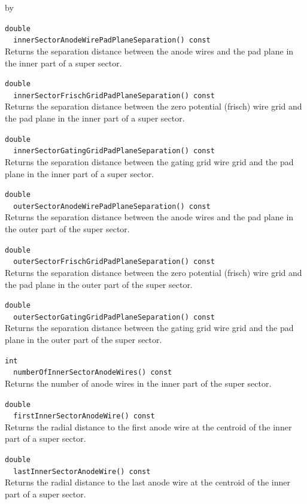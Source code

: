 \documentclass[twoside]{article}
\newcommand{\entrylabel}[1]{\mbox{\textbf{{#1}}}\hfil}%
\newenvironment{entry}
{\begin{list}{}%
    {\renewcommand{\makelabel}{\entrylabel}%
     \setlength{\labelwidth}{90pt}%
     \setlength{\leftmargin}{\labelwidth}
     \advance\leftmargin by \labelsep%
      }%
    }%
  {\end{list}}
\newcommand{\Entrylabel}[1]%
{\raisebox{0pt}[1ex][0pt]{\makebox[\labelwidth][l]%
    {\parbox[t]{\labelwidth}{\hspace{0pt}\textbf{{#1}}}}}}
\newenvironment{Entry}%
{\renewcommand{\entrylabel}{\Entrylabel}\begin{entry}}%
  {\end{entry}}
\begin{document}
\begin{Entry}
  \verb+double+\\
  \verb+  innerSectorAnodeWirePadPlaneSeparation() const+\\
  Returns the separation distance between the anode wires
  and the pad plane in the inner part of a super sector.

  \verb+double+\\
  \verb+  innerSectorFrischGridPadPlaneSeparation() const+\\
  Returns the separation distance between the zero potential
  (frisch) wire grid and the pad plane in the inner part of a 
  super sector.

  \verb+double+\\
  \verb+  innerSectorGatingGridPadPlaneSeparation() const+\\
  Returns the separation distance between the gating
  grid wire grid and the pad plane in the inner part 
  of a super sector.

  \verb+double+\\
  \verb+  outerSectorAnodeWirePadPlaneSeparation() const+\\
  Returns the separation distance between the anode wires
  and the pad plane in the outer part of the super sector.

  \verb+double+\\
  \verb+  outerSectorFrischGridPadPlaneSeparation() const+\\
  Returns the separation distance between the zero potential
  (frisch) wire grid and the pad plane in the outer part of 
  the super sector.
 
  \verb+double+\\
  \verb+  outerSectorGatingGridPadPlaneSeparation() const+\\
  Returns the separation distance between the gating
  grid wire grid and the pad plane in the outer part 
  of the super sector.

  \verb+int+\\
  \verb+  numberOfInnerSectorAnodeWires() const+\\
  Returns the number of anode wires in the inner part
  of the super sector.

  \verb+double+\\
  \verb+  firstInnerSectorAnodeWire() const+\\
  Returns the radial distance to the first anode wire
  at the centroid of the inner part of a super sector.

  \verb+double+\\
  \verb+  lastInnerSectorAnodeWire() const+\\
  Returns the radial distance to the last anode wire
  at the centroid of the inner part of a super sector.


\end{Entry}
\end{document}
